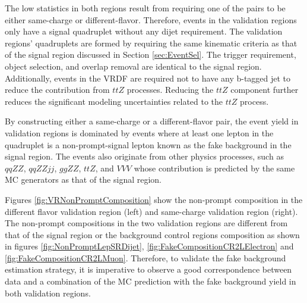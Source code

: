 The low statistics in both regions result from requiring one of the pairs to be either same-charge or different-flavor. Therefore, events in the validation regions only have a signal quadruplet without any dijet requirement. The validation regions' quadruplets are formed by requiring the same kinematic criteria as that of the signal region discussed in Section \ref{sec:EventSel}. The trigger requirement, object selection, and overlap removal are identical to the signal region. Additionally, events in the VRDF are required not to have any b-tagged jet to reduce the contribution from $ttZ$ processes. Reducing the $ttZ$ component further reduces the significant modeling uncertainties related to the $ttZ$ process.

By constructing either a same-charge or a different-flavor pair, the event yield in validation regions is dominated by events where at least one lepton in the quadruplet is a non-prompt-signal lepton known as the fake background in the signal region. The events also originate from other physics processes, such as $qqZZ$, $qqZZjj$, $ggZZ$, $ttZ$, and $VVV$ whose contribution is predicted by the same MC generators as that of the signal region.

Figures \ref{fig:VRNonPromptComposition} show the non-prompt composition in the different flavor validation region (left) and same-charge validation region (right). The non-prompt compositions in the two validation regions are different from that of the signal region or the background control regions composition as shown in figures \ref{fig:NonPromptLepSRDijet}, \ref{fig:FakeCompositionCR2LElectron} and \ref{fig:FakeCompositionCR2LMuon}. Therefore, to validate the fake background estimation strategy, it is imperative to observe a good correspondence between data and a combination of the MC prediction with the fake background yield in both validation regions. 

